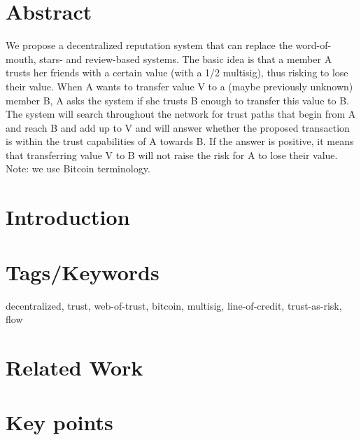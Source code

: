 \documentclass[11pt]{article}
\theoremstyle{definition}
\theoremstyle{corollary}
\begin{document}
  \section{Abstract}
      We propose a decentralized reputation system that can replace the word-of-mouth, stars- and review-based systems.
      The basic idea is that a member A trusts her friends with a certain value (with a 1/2 multisig), thus
      risking to lose their value. When A wants to transfer value V to a (maybe previously unknown) member B,
      A asks the system if she trusts B enough to transfer this value to B. The system will search throughout
      the network for trust paths that begin from A and reach B and add up to V and will answer whether the
      proposed transaction is within the trust capabilities of A towards B. If the answer is positive, it means
      that transferring value V to B will not raise the risk for A to lose their value.
      Note: we use Bitcoin terminology.

  \section{Introduction}

  \section{Tags/Keywords}
      decentralized, trust, web-of-trust, bitcoin, multisig, line-of-credit, trust-as-risk, flow  

  \section{Related Work}

  \section{Key points}
\end{document}
